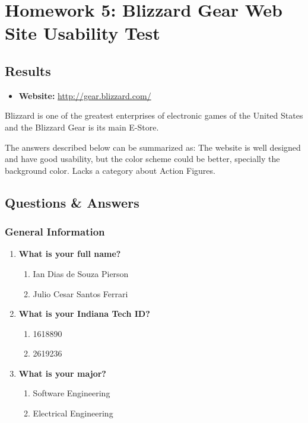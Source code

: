 \chapter{Homework 5: Blizzard Gear Web Site Usability Test}
	\section{Results}
		\begin{itemize}
			\item \textbf{Website:} \url{http://gear.blizzard.com/}
		\end{itemize}

		Blizzard is one of the greatest enterprises of electronic games of the United States and the Blizzard Gear is its main E-Store.

		The answers described below can be summarized as: The website is well designed and have good usability, but the color scheme could be better, specially the background color. Lacks a category about Action Figures.

	\section{Questions \& Answers}
		\subsection{General Information}
			\begin{enumerate}
				\item{\textbf{What is your full name?}
				\begin{enumerate}
					\item Ian Dias de Souza Pierson
					\item Julio Cesar Santos Ferrari
				\end{enumerate}
				}
				\item{\textbf{What is your Indiana Tech ID?}
				\begin{enumerate}
					\item 1618890
					\item 2619236
				\end{enumerate}
				}
				\item{\textbf{What is your major?}
				\begin{enumerate}
					\item Software Engineering
					\item Electrical Engineering
				\end{enumerate}
				}
			\end{enumerate}
